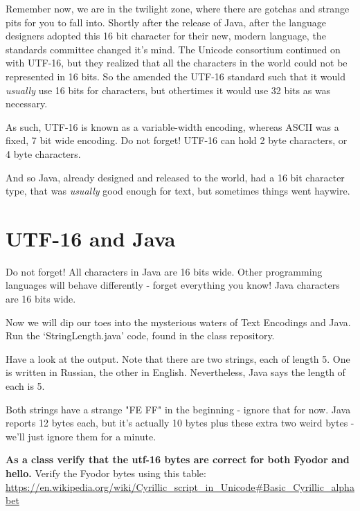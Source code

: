 \documentclass[12pt]{article}
\begin{document}
Remember now, we are in the twilight zone, where there are gotchas and strange pits for you to fall into. Shortly after the release of Java, after the language designers adopted this 16 bit character for their new, modern language, the standards committee changed it's mind. The Unicode consortium continued on with UTF-16, but they realized that all the characters in the world could not be represented in 16 bits. So the amended the UTF-16 standard such that it would \textit{usually} use 16 bits for characters, but othertimes it would use 32 bits as was necessary.

As such, UTF-16 is known as a variable-width encoding, whereas ASCII was a fixed, 7 bit wide encoding. Do not forget! UTF-16 can hold 2 byte characters, or 4 byte characters.

And so Java, already designed and released to the world, had a 16 bit character type, that was \textit{usually} good enough for text, but sometimes things went haywire.

\section{UTF-16 and Java}
Do not forget! All characters in Java are 16 bits wide. Other programming languages will behave differently - forget everything you know! Java characters are 16 bits wide.

Now we will dip our toes into the mysterious waters of Text Encodings and Java. Run the `StringLength.java' code, found in the class repository.

Have a look at the output. Note that there are two strings, each of length 5. One is written in Russian, the other in English. Nevertheless, Java says the length of each is 5. 

Both strings have a strange "FE FF" in the beginning - ignore that for now. Java reports 12 bytes each, but it's actually 10 bytes plus these extra two weird bytes - we'll just ignore them for a minute.

\begin{center}
\textbf{As a class verify that the utf-16 bytes are correct for both Fyodor and hello.}
Verify the Fyodor bytes using this table:
\url{https://en.wikipedia.org/wiki/Cyrillic_script_in_Unicode#Basic_Cyrillic_alphabet}
\end{center}
\end{document}
